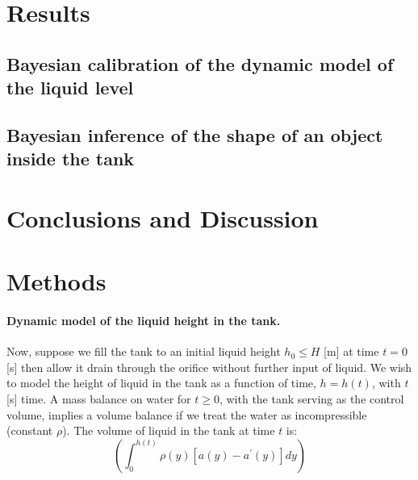 \documentclass[openacc]{rsproca_new}%
\begin{document}
\section{Results}
\subsection{Bayesian calibration of the dynamic model of the liquid level}

\subsection{Bayesian inference of the shape of an object inside the tank}

\section{Conclusions and Discussion}

\section{Methods}






\paragraph{Dynamic model of the liquid height in the tank.} Now, suppose we fill the tank to an initial liquid height $h_0 \leq H$ [m] at time $t=0$ [s] then allow it drain through the orifice without further input of liquid. We wish to model the height of liquid in the tank as a function of time, $h=h(t)$, with $t$ [s] time. 
A mass balance on water for $t\geq 0$, with the tank serving as the control volume, implies a volume balance if we treat the water as incompressible (constant $\rho$). The volume of liquid in the tank at time $t$ is:
\begin{equation}
	\left ( \int_0^{h(t)} \rho(y) [a(y) - a^\prime(y)]dy \right) 
\end{equation}
\end{document}
